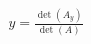 \documentclass[preview]{standalone}
\begin{document}
\begin{align*}
y = \frac{\det(A_y)}{\det(A)}
\end{align*}
\end{document}
